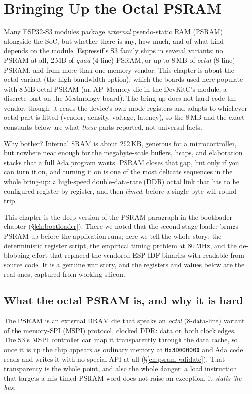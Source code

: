 \chapter{Bringing Up the Octal PSRAM}
\label{ch:psram}

Many ESP32-S3 modules package \emph{external} pseudo-static RAM (PSRAM) alongside
the SoC, but whether there is any, how much, and of what kind depends on the
module. Espressif's S3 family ships in several variants: no PSRAM at all, 2\,MB of
\emph{quad} (4-line) PSRAM, or up to 8\,MB of \emph{octal} (8-line) PSRAM, and from
more than one memory vendor. This chapter is about the octal variant (the
high-bandwidth option), which the boards used here populate with 8\,MB octal PSRAM
(an AP~Memory die in the DevKitC's module, a discrete part on the Meshnology
board). The bring-up does not hard-code the vendor, though: it reads the
device's own mode registers and adapts to whichever octal part is fitted (vendor,
density, voltage, latency), so the 8\,MB and the exact constants below are what
\emph{these} parts reported, not universal facts.

Why bother? Internal SRAM is about 292\,KB, generous for a microcontroller, but
nowhere near enough for the megabyte-scale buffers, heaps, and elaboration stacks
that a full Ada program wants. PSRAM closes that gap, but only if you can turn it
on, and turning it on is one of the most delicate sequences in the whole bring-up:
a high-speed double-data-rate (DDR) octal link that has to be configured register
by register, and then \emph{timed}, before a single byte will round-trip.

This chapter is the deep version of the PSRAM paragraph in the bootloader chapter
(\S\ref{ch:bootloader}). There we noted that the second-stage loader brings PSRAM
up before the application runs; here we tell the whole story: the deterministic
register script, the empirical timing problem at 80\,MHz, and the de-blobbing
effort that replaced the vendored ESP-IDF binaries with readable from-source code.
It is a genuine war story, and the registers and values below are the real ones,
captured from working silicon.

\section{What the octal PSRAM is, and why it is hard}

The PSRAM is an external DRAM die that speaks an \emph{octal} (8-data-line) variant
of the memory-SPI (MSPI) protocol, clocked DDR: data on both clock edges. The
S3's MSPI controller can map it transparently through the data cache, so once it is
up the chip appears as ordinary memory at \texttt{0x3D000000} and Ada code reads and
writes it with no special API at all (\S\ref{ch:psram-validate}). That transparency
is the whole point, and also the whole danger: a load instruction that targets a
mis-timed PSRAM word does not raise an exception, it \emph{stalls the bus}.

